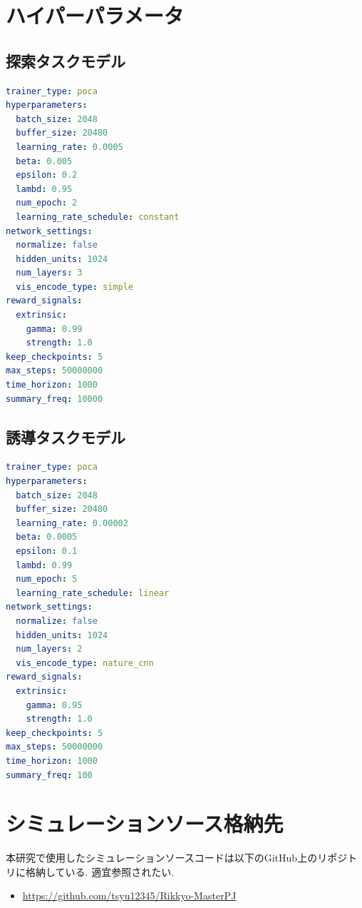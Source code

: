 \chapter{ハイパーパラメータ}
\section{探索タスクモデル}
\begin{lstlisting}[language=yaml]
trainer_type: poca
hyperparameters:
  batch_size: 2048
  buffer_size: 20480
  learning_rate: 0.0005
  beta: 0.005
  epsilon: 0.2
  lambd: 0.95
  num_epoch: 2
  learning_rate_schedule: constant
network_settings:
  normalize: false
  hidden_units: 1024
  num_layers: 3
  vis_encode_type: simple
reward_signals:
  extrinsic:
    gamma: 0.99
    strength: 1.0
keep_checkpoints: 5
max_steps: 50000000
time_horizon: 1000
summary_freq: 10000
\end{lstlisting}
\section{誘導タスクモデル}
\begin{lstlisting}[language=yaml]
trainer_type: poca
hyperparameters:
  batch_size: 2048
  buffer_size: 20480
  learning_rate: 0.00002
  beta: 0.0005
  epsilon: 0.1
  lambd: 0.99
  num_epoch: 5
  learning_rate_schedule: linear
network_settings:
  normalize: false
  hidden_units: 1024
  num_layers: 2
  vis_encode_type: nature_cnn
reward_signals:
  extrinsic:
    gamma: 0.95
    strength: 1.0
keep_checkpoints: 5
max_steps: 50000000
time_horizon: 1000
summary_freq: 100
\end{lstlisting}
\chapter{シミュレーションソース格納先}
本研究で使用したシミュレーションソースコードは以下のGitHub上のリポジトリに格納している. 適宜参照されたい.
\begin{itemize}
  \item \url{https://github.com/tsyu12345/Rikkyo-MasterPJ}
\end{itemize}

